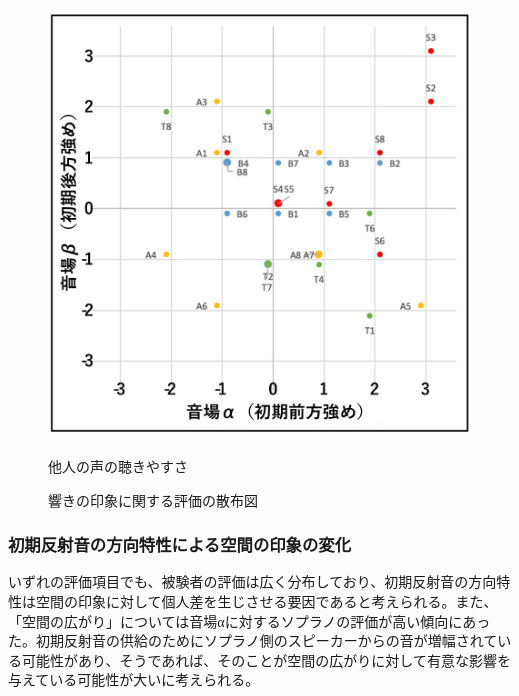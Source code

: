 \documentclass[11pt,a4j]{jreport}
\begin{document}
\begin{figure}[H]
  \begin{minipage}{1\linewidth}
    \centering
    \includegraphics[width=.45\linewidth]{images/subjectiveExp/scat_early_03othersVoice.pdf}
    \caption*{他人の声の聴きやすさ}
  \end{minipage}
  \caption{響きの印象に関する評価の散布図}
  \label{fig:響きの印象に関する評価の散布図}
\end{figure}

\newpage
\subsubsection*{初期反射音の方向特性による空間の印象の変化}
いずれの評価項目でも、被験者の評価は広く分布しており、初期反射音の方向特性は空間の印象に対して個人差を生じさせる要因であると考えられる。また、「空間の広がり」については音場αに対するソプラノの評価が高い傾向にあった。初期反射音の供給のためにソプラノ側のスピーカーからの音が増幅されている可能性があり、そうであれば、そのことが空間の広がりに対して有意な影響を与えている可能性が大いに考えられる。

\end{document}
